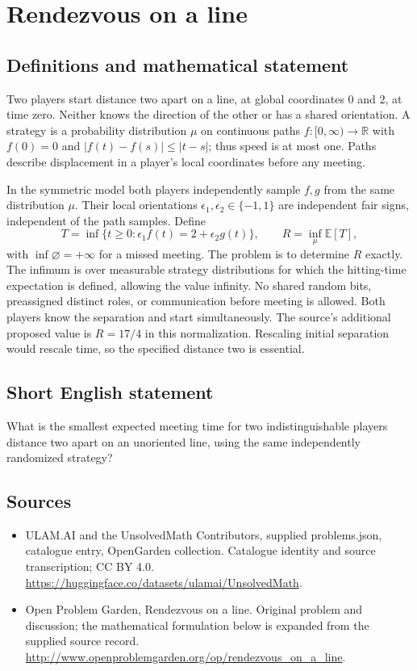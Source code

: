 \documentclass[11pt,a4paper]{article}
\begin{document}
\section*{Rendezvous on a line}\label{statement}

\subsection{Definitions and mathematical statement}
Two players start distance two apart on a line, at global coordinates
$0$ and $2$, at time zero. Neither knows the direction of the other
or has a shared orientation. A strategy is a probability distribution
$\mu$ on continuous paths $f:[0,\infty)\to\mathbb R$ with $f(0)=0$
and $|f(t)-f(s)|\le|t-s|$; thus speed is at most one. Paths describe
displacement in a player's local coordinates before any meeting.

In the symmetric model both players independently sample $f,g$
from the same distribution $\mu$. Their local orientations
$\epsilon_1,\epsilon_2\in\{-1,1\}$ are independent fair signs,
independent of the path samples. Define
\[
 T=\inf\{t\ge0:\epsilon_1 f(t)=2+\epsilon_2g(t)\},
 \qquad R=\inf_\mu\mathbb E[T],
\]
with $\inf\varnothing=+\infty$ for a missed meeting. The problem is
to determine $R$ exactly. The infimum is over measurable strategy
distributions for which the hitting-time expectation is defined,
allowing the value infinity.
No shared random bits, preassigned distinct roles, or communication
before meeting is allowed. Both players know the separation and
start simultaneously. The source's additional proposed value is
$R=17/4$ in this normalization. Rescaling initial separation would
rescale time, so the specified distance two is essential.
\subsection{Short English statement}
What is the smallest expected meeting time for two indistinguishable players distance two apart on an unoriented line, using the same independently randomized strategy?
\subsection{Sources}
\begin{itemize}
\item[S1] ULAM.AI and the UnsolvedMath Contributors, supplied problems.json, catalogue entry, OpenGarden collection. Catalogue identity and source transcription; CC BY 4.0.
\url{https://huggingface.co/datasets/ulamai/UnsolvedMath}.
\item[S2] Open Problem Garden, Rendezvous on a line. Original problem and discussion; the mathematical formulation below is expanded from the supplied source record.
\url{http://www.openproblemgarden.org/op/rendezvous_on_a_line}.
\end{itemize}
\end{document}
